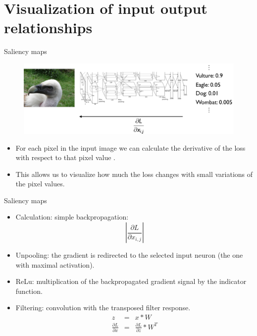 \documentclass[xcolor=pdftex,dvipsnames,table]{beamer}
\begin{document}
\section{Visualization of input output relationships}

\begin{frame}{Saliency maps}
	\begin{figure}[htb]
	  \centering
	  \includegraphics[width=\textwidth]{../graphics/Vis_saliency_map_principle.pdf}
	\end{figure}
\begin{itemize}
	\item For each pixel in the input image we can calculate the derivative of the loss with respect to that pixel value \cite{Simonyan:2013}.
	\item This allows us to visualize how much the loss changes with small variations of the pixel values.
\end{itemize}
\end{frame}

\begin{frame}{Saliency maps}
\begin{itemize}
	\item Calculation: simple backpropagation:
	\begin{equation}
		\left|\frac{\partial L}{\partial x_{i,j}}\right|
	\end{equation} 
	\item Unpooling: the gradient is redirected to the selected input neuron (the one with maximal activation).
	\item ReLu: multiplication of the backpropagated gradient signal by the indicator function.
	\item Filtering: convolution with the transposed filter response.
	\begin{eqnarray}
		z &=& x \ast W \nonumber \\
		\frac{\partial L}{\partial x} &=& \frac{\partial L}{\partial z} \ast W^T 
	\end{eqnarray}
\end{itemize}
\end{frame}
\end{document}
